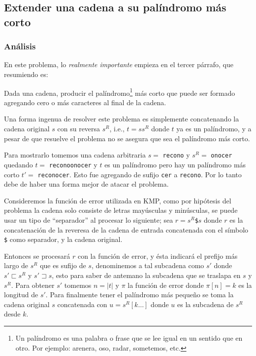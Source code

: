 \newpage


\subsection{Extender una cadena a su palíndromo más corto}

\subsubsection{Análisis}
En este problema, lo \textit{realmente importante} empieza en el tercer párrafo, 
que resumiendo es:

\begin{tcolorbox}
Dada una cadena, producir el palíndromo\footnote{Un palíndromo es una palabra o frase que se lee
igual en un sentido que en otro. Por ejemplo: arenera, oso, radar, sometemos, etc.} más corto que
puede ser formado agregando cero o más caracteres al final de la cadena.
\end{tcolorbox}

Una forma ingenua de resolver este problema es simplemente concatenando la cadena original $s$
con su reversa $s^R$, i.e., $t = ss^R$ donde $t$ ya es un palíndromo, y a pesar de que resuelve el
problema no se asegura que sea el palíndromo más corto.

Para mostrarlo tomemos una cadena arbitraria $s = $ \texttt{recono} y $s^R =$ \texttt{onocer}
quedando $t = $ \texttt{reconoonocer} y $t$ es un palíndromo pero hay un palíndromo más corto
$t' = $ \texttt{reconocer}. Esto fue agregando de sufijo \texttt{cer} a \texttt{recono}. 
Por lo tanto debe de haber una forma mejor de atacar el problema.

Consideremos la función de error utilizada en KMP, como por hipótesis del problema la cadena solo
consiste de letras mayúsculas y minúsculas, se puede usar un tipo de ``separador'' al procesar lo
siguiente; sea $r = s^R$\texttt{\$}$s$ donde $r$ es la concatenación de la reveresa de la cadena de
entrada concatenada con el símbolo \texttt{\$} como separador, y la cadena original.

Entonces se procesará $r$ con la función de error, y ésta indicará el prefijo más largo de $s^R$
que es sufijo de $s$, denominemos a tal subcadena como $s'$ donde 
$s' \sqsubset s^R$ y
$s' \sqsupset s$, esto para saber de antemano la subcadena que se traslapa en $s$ y $s^R$. Para
obtener $s'$ tomemos $n = \vert t \vert$ y $\pi$ la función de error donde $\pi[n] = k$ es la 
longitud de $s'$. Para finalmente tener el palíndromo más pequeño se toma la cadena original $s$
concatenada con $u = s^R[k \ldots]$ donde $u$ es la subcadena de $s^R$ desde $k$.

